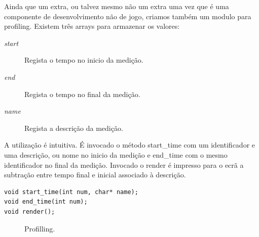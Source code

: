 Ainda que um extra, ou talvez mesmo não um extra uma vez que é uma componente de desenvolvimento não de jogo, criamos também um modulo para profiling. Existem três arrays para armazenar os valores:

\begin{description}
\item[\textit{start}] Regista o tempo no inicio da medição.
\item[\textit{end}] Regista o tempo no final da medição.
\item[\textit{name}] Regista a descrição da medição.
\end{description}

A utilização é intuitiva. É invocado o método start\_time com um identificador e uma descrição, ou nome no inicio da medição e end\_time com o mesmo identificador no final da medição. Invocado o render é impresso para o ecrã a subtração entre tempo final e inicial associado à descrição.

\begin{lstlisting}[caption=Métodos para trabalhar com profiling.]
void start_time(int num, char* name);
void end_time(int num);
void render();
\end{lstlisting}

\begin{figure}[here]
                 \caption{Profilling.}
                 \label{fig:prototype}
\end{figure}
